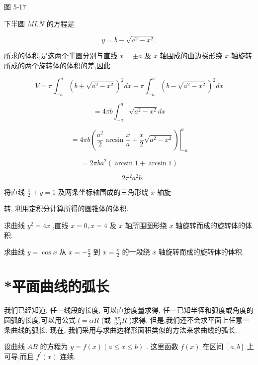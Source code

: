 \documentclass[lang=cn,newtx,12pt,scheme=chinese]{elegantbook}
\begin{document}
图 5-17

下半圆 \({MLN}\) 的方程是

\[
y = b - \sqrt{{a}^{2} - {x}^{2}}.
\]

所求的体积,是这两个半圆分别与直线 \(x = \pm a\) 及 \(x\) 轴围成的曲边梯形绕 \(x\) 轴旋转所成的两个旋转体的体积的差,因此

\[
V = \pi {\int }_{-a}^{a}{\left( b + \sqrt{{a}^{2} - {x}^{2}}\right) }^{2}{dx} - \pi {\int }_{-a}^{a}{\left( b - \sqrt{{a}^{2} - {x}^{2}}\right) }^{2}{dx}
\]

\[
= {4\pi b}{\int }_{-a}^{a}\sqrt{{a}^{2} - {x}^{2}}{dx}
\]

\[
= {\left. 4\pi b\left( \frac{{a}^{2}}{2}\arcsin \frac{x}{a} + \frac{x}{2}\sqrt{{a}^{2} - {x}^{2}}\right) \right| }_{-a}^{a}
\]

\[
= {2\pi b}{a}^{2}\left( {\arcsin 1 + \arcsin 1}\right)
\]

\[
= 2{\pi }^{2}{a}^{2}b\text{. }
\]

\begin{problemset}[练习]

\item 将直线 \(\frac{x}{2} + y = 1\) 及两条坐标轴围成的三角形绕 \(x\) 轴旋

转, 利用定积分计算所得的圆锥体的体积.

\item 求曲线 \({y}^{2} = {4x}\) ,直线 \(x = 0,x = 4\) 及 \(x\) 轴所围图形绕 \(x\) 轴旋转而成的旋转体的体积.

\item 求曲线 \(y = \cos x\) 从 \(x = - \frac{\pi }{2}\) 到 \(x = \frac{\pi }{2}\) 的一段绕 \(x\) 轴旋转而成的旋转体的体积.

\end{problemset}

\section{*平面曲线的弧长}

我们已经知道, 任一线段的长度, 可以直接度量求得, 任一已知半径和弧度或角度的圆弧的长度,可以用公式 \(l = {\alpha R}\) (或 \(\frac{n\pi }{180}R\) )求得. 但是,我们还不会求平面上任意一条曲线的弧长. 现在, 我们采用与求曲边梯形面积类似的方法来求曲线的弧长.

设曲线 \({AB}\) 的方程为 \(y = f\left( x\right) \left( {a \leq x \leq b}\right)\) . 这里函数 \(f\left( x\right)\) 在区间 \(\left\lbrack {a,b}\right\rbrack\) 上可导,而且 \({f}^{\prime }\left( x\right)\) 连续.
\end{document}
